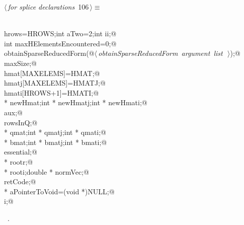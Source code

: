 \documentclass{article}
\begin{document}
\begin{flushleft} \small
\begin{minipage}{\linewidth}\label{scrap192}\raggedright\small
{} $\langle\,${\itshape for splice declarations}\nobreak\ {\footnotesize {106}}$\,\rangle\equiv$
\vspace{-1ex}
\begin{list}{}{} \item
\mbox{}\verb@@\\
\mbox{}\verb@int hrows=HROWS;int aTwo=2;int ii;@\\
\mbox{}\verb@static int maxHElementsEncountered=0;@\\
\mbox{}\verb@void obtainSparseReducedForm(@\hbox{$\langle\,${\itshape obtainSparseReducedForm argument list}\nobreak\ {\footnotesize {}}$\,\rangle$}\verb@);@\\
\mbox{}\verb@int maxSize;@\\
\mbox{}\verb@double hmat[MAXELEMS]=HMAT;@\\
\mbox{}\verb@int hmatj[MAXELEMS]=HMATJ;@\\
\mbox{}\verb@int hmati[HROWS+1]=HMATI;@\\
\mbox{}\verb@double * newHmat;int * newHmatj;int * newHmati;@\\
\mbox{}\verb@int aux;@\\
\mbox{}\verb@int rowsInQ;@\\
\mbox{}\verb@double * qmat;int * qmatj;int * qmati;@\\
\mbox{}\verb@double * bmat;int * bmatj;int * bmati;@\\
\mbox{}\verb@int essential;@\\
\mbox{}\verb@double * rootr;@\\
\mbox{}\verb@double * rooti;double * normVec;@\\
\mbox{}\verb@int retCode;@\\
\mbox{}\verb@void * aPointerToVoid=(void *)NULL;@\\
\mbox{}\verb@int i;@\\
\mbox{}\verb@@{\NWsep}
\end{list}
\vspace{-1.5ex}
\footnotesize
\begin{list}{}{\setlength{\itemsep}{-\parsep}\setlength{\itemindent}{-\leftmargin}}
\item \NWtxtMacroRefIn\ .

\end{list}
\end{minipage}
\end{flushleft}
\end{document}
